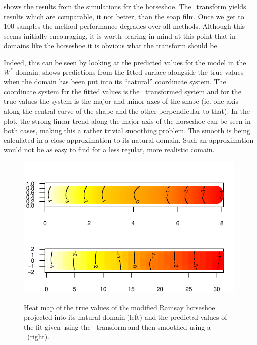  shows the results from the simulations for the horseshoe. The \sch\ transform yields results which are comparable, it not better, than the soap film. Once we get to 100 samples the method performance degrades over all methods. Although this seems initially encouraging, it is worth bearing in mind at this point that in domains like the horseshoe it is obvious what the transform should be.

Indeed, this can be seen by looking at the predicted values for the model in the $W^*$ domain.  shows predictions from the fitted surface alongside the true values when the domain has been put into its ``natural'' coordinate system. The coordinate system for the fitted values is the \sch\ transformed system and for the true values the system is the major and minor axes of the shape (ie. one axis along the central curve of the shape and the other perpendicular to that). In the plot, the strong linear trend along the major axis of the horseshoe can be seen in both cases, making this a rather trivial smoothing problem. The smooth is being calculated in a close approximation to its natural domain. Such an approximation would not be as easy to find for a less regular, more realistic domain.

\begin{figure}
\centering
\includegraphics{sc/figs/hsvisgam.pdf} \\
\caption{Heat map of the true values of the modified Ramsay horseshoe projected into its natural domain (left) and the predicted values of the fit given using the \sch\ transform and then smoothed using a \tprs\ (right).}
\label{hsvisgam}
\end{figure}

